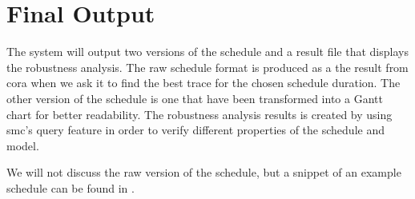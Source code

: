 \section{Final Output}\label{sec:final}
The system will output two versions of the schedule and a result file that displays the robustness analysis.
The raw schedule format is produced as a the result from \gls{cora} when we ask it to find the best trace for the chosen schedule duration. The other version of the schedule is one that have been transformed into a Gantt chart for better readability. The robustness analysis results is created by using \gls{smc}'s query feature in order to verify different properties of the schedule and model.

We will not discuss the raw version of the schedule, but a snippet of an example schedule can be found in .



